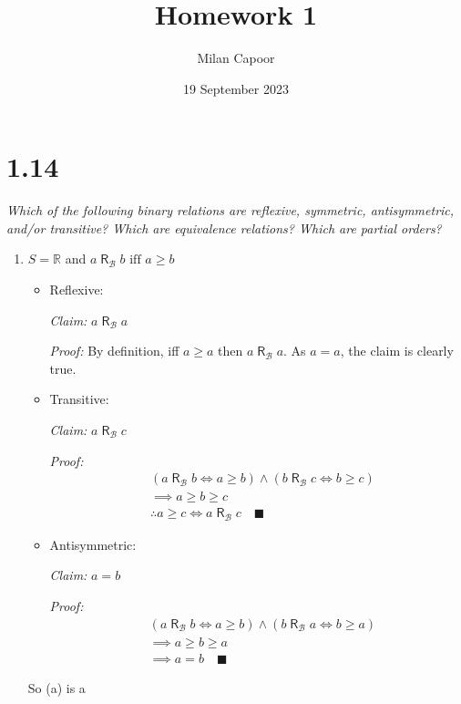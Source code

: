 \documentclass[12pt]{article}
\title{Homework 1}
\author{Milan Capoor}
\date{19 September 2023}
\newcommand{\R}{\mathbb{R}}
\newcommand{\qed}{\quad \blacksquare}
\newcommand{\rb}{\; \mathsf{R}_\mathcal{B}\;}
\begin{document}
\maketitle
\section*{1.14}
\emph{Which of the following binary relations are reflexive, symmetric, antisymmetric, and/or transitive? Which are equivalence relations? Which are partial orders?}
\begin{enumerate}[label=(\alph*)]
    \item $S =\R$ and $a\; \mathsf{R}_\mathcal{B} \; b \text{ iff } a \geq b$ 
    
    \color{blue}
        \begin{itemize}
            \item Reflexive: 
            
            \emph{Claim:} $a \rb a$

            \emph{Proof:} By definition, iff $a \geq a$ then $a \rb a$. As $a = a$, the claim is clearly true. 

            \item Transitive: 
            
            \emph{Claim:} $a \rb c$

            \emph{Proof:}
            \begin{align*}
                &(a \rb b \iff a \geq b) \land (b \rb c \iff b \geq c) \\
                &\implies a \geq b \geq c\\
                &\therefore a \geq c \iff a \rb c \qed
            \end{align*}

            \item Antisymmetric: 
            
            \emph{Claim:} $a = b$ 

            \emph{Proof:}
            \begin{align*}
                &(a \rb b \iff a \geq b) \land (b \rb a \iff b \geq a)\\
                &\implies a \geq b \geq a\\
                &\implies a = b \qed
            \end{align*}
        \end{itemize}
        So (a) is a 
    \color{black}
        

\end{enumerate}
\end{document}
